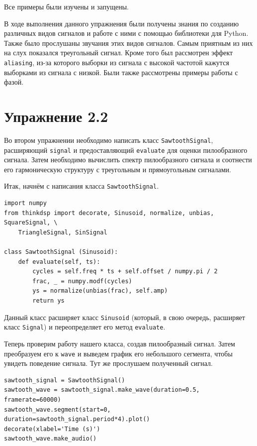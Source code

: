 \documentclass[a4paper, 14pt]{extarticle}
\begin{document}
    Все примеры были изучены и запущены.

    В ходе выполнения данного упражнения были получены знания по созданию различных видов сигналов и работе с ними с помощью библиотеки для Python.
    Также было прослушаны звучания этих видов сигналов. Самым приятным из них на слух показался треугольный сигнал.
    Кроме того был рассмотрен эффект \texttt{aliasing}, из-за которого выборки из сигнала с высокой частотой кажутся выборками из сигнала с низкой.
    Были также рассмотрены примеры работы с фазой.

    \newpage

    \section{Упражнение 2.2}
    \label{sec:task2}

    Во втором упражнении необходимо написать класс \texttt{SawtoothSignal}, расширяющий \texttt{signal} и предоставляющий \texttt{evaluate} для оценки пилообразного сигнала.
    Затем необходимо вычислить спектр пилообразного сигнала и соотнести его гармоническую структуру с треугольным и прямоугольным сигналами.

    Итак, начнём с написания класса \texttt{SawtoothSignal}.

    \begin{lstlisting}[caption= Создание класса \texttt{SawtoothSignal}., label={lst:task2_create_class}]
import numpy
from thinkdsp import decorate, Sinusoid, normalize, unbias, SquareSignal, \
    TriangleSignal, SinSignal

class SawtoothSignal (Sinusoid):
    def evaluate(self, ts):
        cycles = self.freq * ts + self.offset / numpy.pi / 2
        frac, _ = numpy.modf(cycles)
        ys = normalize(unbias(frac), self.amp)
        return ys
    \end{lstlisting}

    Данный класс расширяет класс \texttt{Sinusoid} (который, в свою очередь, расширяет класс \texttt{Signal}) и переопределяет его метод \texttt{evaluate}.

    Теперь проверим работу нашего класса, создав пилообразный сигнал. Затем преобразуем его к \texttt{wave} и выведем график его небольшого сегмента, чтобы увидеть поведение сигнала.
    Тут же прослушаем полученный сигнал.

    \begin{lstlisting}[caption= Работа с пилообразным сигналом., label={lst:task2_work_with_swatooth}]
sawtooth_signal = SawtoothSignal()
sawtooth_wave = sawtooth_signal.make_wave(duration=0.5, framerate=60000)
sawtooth_wave.segment(start=0, duration=sawtooth_signal.period*4).plot()
decorate(xlabel='Time (s)')
sawtooth_wave.make_audio()
    \end{lstlisting}
\end{document}

